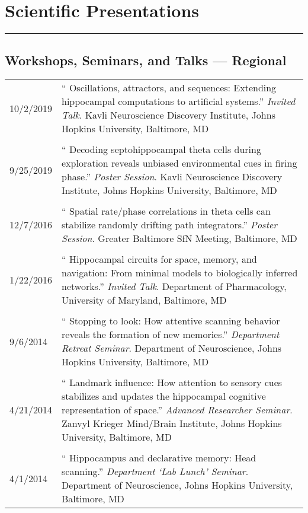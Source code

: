 \documentclass[10pt]{article}
\newcommand{\unpubtitle}[1]{{\color{hopkinsblue} #1}}
\newcommand{\newsection}[2]{%
  \section*{#1}
  \vspace{-.125in}
  \hrule
  \vspace{.22in}
  \label{sec:#2}
}
\begin{document}
\medskip

\newsection{Scientific Presentations}{talks}

\subsection*{Workshops, Seminars, and Talks --- Regional}

\begin{longtable}{@{\hspace{0.2in}}l>{\raggedright\arraybackslash}p{}}
  10/2/2019 \hspace{0.1in} & ``\unpubtitle{Oscillations, attractors, and
  sequences: Extending hippocampal computations to artificial systems}.''
  \emph{Invited Talk}. Kavli Neuroscience Discovery Institute, Johns Hopkins
  University, Baltimore, MD\\
  \tabularnewline
  9/25/2019 & ``\unpubtitle{Decoding septohippocampal theta cells during
  exploration reveals unbiased environmental cues in firing phase}.''
  \emph{Poster Session}. Kavli Neuroscience Discovery Institute, Johns Hopkins
  University, Baltimore, MD\\
  \tabularnewline
  12/7/2016 & ``\unpubtitle{Spatial rate/phase correlations in theta cells
  can stabilize randomly drifting path integrators}.'' \emph{Poster Session}.
  Greater Baltimore SfN Meeting, Baltimore, MD\\
  \tabularnewline
  1/22/2016 & ``\unpubtitle{Hippocampal circuits for space, memory, and
  navigation: From minimal models to biologically inferred networks}.''
  \emph{Invited Talk}. Department of Pharmacology, University of Maryland,
  Baltimore, MD\\
  \tabularnewline
  9/6/2014 & ``\unpubtitle{Stopping to look: How attentive scanning behavior
  reveals the formation of new memories}.'' \emph{Department Retreat Seminar}.
  Department of Neuroscience, Johns Hopkins University, Baltimore, MD\\
  \tabularnewline
  4/21/2014 & ``\unpubtitle{Landmark influence: How attention to sensory cues
  stabilizes and updates the hippocampal cognitive representation of space}.''
  \emph{Advanced Researcher Seminar}. Zanvyl Krieger Mind/Brain Institute, Johns
  Hopkins University, Baltimore, MD\\
  \tabularnewline
  4/1/2014 & ``\unpubtitle{Hippocampus and declarative memory:
  Head scanning}.'' \emph{Department `Lab Lunch' Seminar}. Department of
  Neuroscience, Johns Hopkins University, Baltimore, MD\\
\end{longtable}
\end{document}
